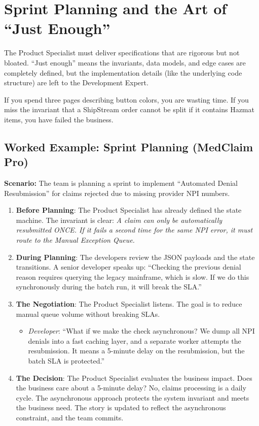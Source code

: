\documentclass[
  11pt,
  openany,
  oneside]{book}
\providecommand{\tightlist}{%
  \setlength{\itemsep}{0pt}\setlength{\parskip}{0pt}}
\begin{document}
\section{Sprint Planning and the Art of ``Just
Enough''}\label{sprint-planning-and-the-art-of-just-enough}

The Product Specialist must deliver specifications that are rigorous but
not bloated. ``Just enough'' means the invariants, data models, and edge
cases are completely defined, but the implementation details (like the
underlying code structure) are left to the Development Expert.

If you spend three pages describing button colors, you are wasting time.
If you miss the invariant that a ShipStream order cannot be split if it
contains Hazmat items, you have failed the business.

\subsection{Worked Example: Sprint Planning (MedClaim
Pro)}\label{worked-example-sprint-planning-medclaim-pro}

\textbf{Scenario:} The team is planning a sprint to implement
``Automated Denial Resubmission'' for claims rejected due to missing
provider NPI numbers.

\begin{enumerate}
\def\labelenumi{\arabic{enumi}.}
\tightlist
\item
  \textbf{Before Planning}: The Product Specialist has already defined
  the state machine. The invariant is clear: \emph{A claim can only be
  automatically resubmitted ONCE. If it fails a second time for the same
  NPI error, it must route to the Manual Exception Queue.}
\item
  \textbf{During Planning}: The developers review the JSON payloads and
  the state transitions. A senior developer speaks up: ``Checking the
  previous denial reason requires querying the legacy mainframe, which
  is slow. If we do this synchronously during the batch run, it will
  break the SLA.''
\item
  \textbf{The Negotiation}: The Product Specialist listens. The goal is
  to reduce manual queue volume without breaking SLAs.

  \begin{itemize}
  \tightlist
  \item
    \emph{Developer}: ``What if we make the check asynchronous? We dump
    all NPI denials into a fast caching layer, and a separate worker
    attempts the resubmission. It means a 5-minute delay on the
    resubmission, but the batch SLA is protected.''
  \end{itemize}
\item
  \textbf{The Decision}: The Product Specialist evaluates the business
  impact. Does the business care about a 5-minute delay? No, claims
  processing is a daily cycle. The asynchronous approach protects the
  system invariant and meets the business need. The story is updated to
  reflect the asynchronous constraint, and the team commits.
\end{enumerate}
\end{document}
